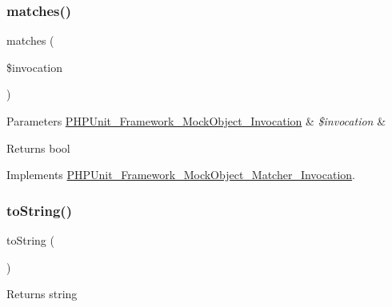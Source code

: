 \subsubsection{\texorpdfstring{matches()}{matches()}}
{\footnotesize\ttfamily matches (\begin{DoxyParamCaption}\item[{\mbox{\hyperlink{interface_p_h_p_unit___framework___mock_object___invocation}{P\+H\+P\+Unit\+\_\+\+Framework\+\_\+\+Mock\+Object\+\_\+\+Invocation}}}]{\$invocation }\end{DoxyParamCaption})}


\begin{DoxyParams}[1]{Parameters}
\mbox{\hyperlink{interface_p_h_p_unit___framework___mock_object___invocation}{P\+H\+P\+Unit\+\_\+\+Framework\+\_\+\+Mock\+Object\+\_\+\+Invocation}} & {\em \$invocation} & \\
\hline
\end{DoxyParams}
\begin{DoxyReturn}{Returns}
bool 
\end{DoxyReturn}


Implements \mbox{\hyperlink{interface_p_h_p_unit___framework___mock_object___matcher___invocation_a4988c6fa11e275302172d0a4ae32dd3a}{P\+H\+P\+Unit\+\_\+\+Framework\+\_\+\+Mock\+Object\+\_\+\+Matcher\+\_\+\+Invocation}}.

\mbox{\label{class_p_h_p_unit___framework___mock_object___matcher___invoked_at_index_a5558c5d549f41597377fa1ea8a1cefa3}} 
\subsubsection{\texorpdfstring{to\+String()}{toString()}}
{\footnotesize\ttfamily to\+String (\begin{DoxyParamCaption}{ }\end{DoxyParamCaption})}

\begin{DoxyReturn}{Returns}
string 
\end{DoxyReturn}


